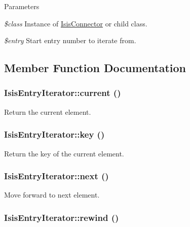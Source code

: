\begin{DoxyParams}{Parameters}
\item[{\em \$class}]Instance of \hyperlink{classIsisConnector}{IsisConnector} or child class.\item[{\em \$entry}]Start entry number to iterate from. \end{DoxyParams}


\subsection{Member Function Documentation}
\hypertarget{classIsisEntryIterator_ac482f43403fc4d2e1b620fb4e0f6797f}{
\subsubsection[{current}]{\setlength{\rightskip}{0pt plus 5cm}IsisEntryIterator::current ()}}
\label{classIsisEntryIterator_ac482f43403fc4d2e1b620fb4e0f6797f}
Return the current element. \hypertarget{classIsisEntryIterator_a4a740dacedb86023ece4561092c33a65}{
\subsubsection[{key}]{\setlength{\rightskip}{0pt plus 5cm}IsisEntryIterator::key ()}}
\label{classIsisEntryIterator_a4a740dacedb86023ece4561092c33a65}
Return the key of the current element. \hypertarget{classIsisEntryIterator_a2d1d0fe5d3c22d1720e93e03952b877d}{
\subsubsection[{next}]{\setlength{\rightskip}{0pt plus 5cm}IsisEntryIterator::next ()}}
\label{classIsisEntryIterator_a2d1d0fe5d3c22d1720e93e03952b877d}
Move forward to next element. \hypertarget{classIsisEntryIterator_a985e88cdfb69b42e3389f24c08b2404a}{
\subsubsection[{rewind}]{\setlength{\rightskip}{0pt plus 5cm}IsisEntryIterator::rewind ()}}
